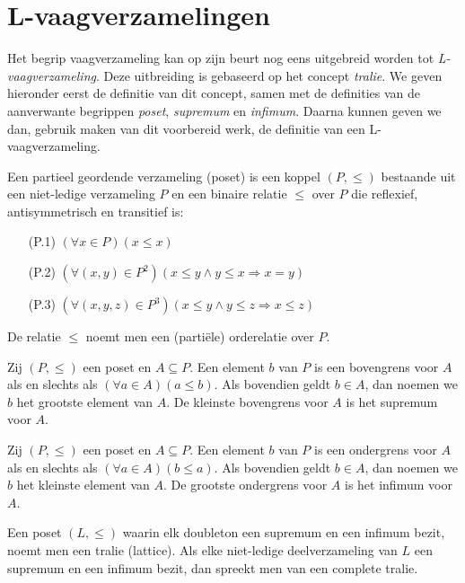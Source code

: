 \section{L-vaagverzamelingen}

Het begrip vaagverzameling kan op zijn beurt nog eens uitgebreid worden tot 
\emph{L-vaagverzameling}. Deze uitbreiding is gebaseerd op het concept \emph{tralie}. We geven
hieronder eerst de definitie van dit concept, samen met de definities van de aanverwante
begrippen \emph{poset}, \emph{supremum} en \emph{infimum}. Daarna kunnen geven we dan, gebruik
maken van dit voorbereid werk, de definitie van een L-vaagverzameling. 
\begin{definitie}
Een partieel geordende verzameling (poset) is een koppel $(P,\le)$ bestaande uit een niet-ledige
verzameling $P$ en een binaire relatie $\le$ over $P$ die reflexief, antisymmetrisch en 
transitief is:
\begin{itemize}
  \item[(P.1)] $(\forall x \in P)(x \le x)$
  \item[(P.2)] $(\forall (x,y) \in P^2)(x \le y \land y \le x \Rightarrow x = y)$
  \item[(P.3)] $(\forall (x,y,z) \in P^3)(x \le y \land y \le z \Rightarrow x \le z)$
\end{itemize}
De relatie $\le$ noemt men een (parti\"ele) orderelatie over $P$.
\end{definitie} 
\begin{definitie}
Zij $(P,\le)$ een poset en $A \subseteq P$. Een element $b$ van $P$ is een bovengrens voor $A$
als en slechts als $(\forall a \in A)(a \le b)$. Als bovendien geldt $b \in A$, dan noemen
we $b$ het grootste element van $A$. De kleinste bovengrens voor $A$ is het
supremum voor $A$.
\end{definitie}
\begin{definitie}
Zij $(P,\le)$ een poset en $A \subseteq P$. Een element $b$ van $P$ is een ondergrens voor $A$
als en slechts als $(\forall a \in A)(b \le a)$. Als bovendien geldt $b \in A$, dan noemen
we $b$ het kleinste element van $A$. De grootste ondergrens voor $A$ is het
infimum voor $A$.
\end{definitie}
\begin{definitie}
Een poset $(L,\le)$ waarin elk doubleton een supremum en een infimum bezit, noemt men een tralie 
(lattice). Als elke niet-ledige deelverzameling van $L$
een supremum en een infimum bezit, dan spreekt men van een complete tralie.
\end{definitie}
